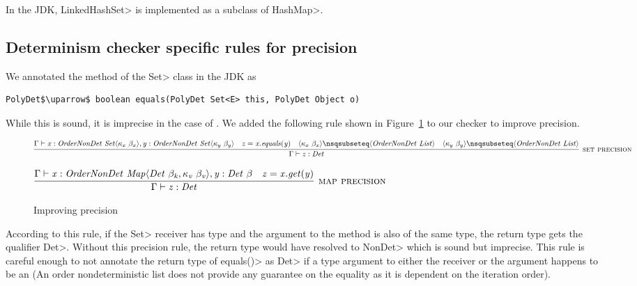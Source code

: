 In the JDK, \<LinkedHashSet> is implemented as a subclass of \<HashMap>.

\subsection{Determinism checker specific rules for precision}\label{precision}
We annotated the  method of the \<Set> class in the JDK as
\begin{verbatim}
PolyDet$\uparrow$ boolean equals(PolyDet Set<E> this, PolyDet Object o)
\end{verbatim}
While this is sound, it is imprecise in the case of . We added the following rule shown in Figure~\ref{fig-precision-rules} to our checker to improve precision.
\begin{figure}
    $\infer[\textsc{set precision}]{\Gamma \vdash \|z : Det|}{\Gamma \vdash \|x| : \|OrderNonDet| \ \|Set|\angles{ \kappa_{x} \ \beta_{x}}, \|y| : \|OrderNonDet| \ \|Set|\angles{ \kappa_{y} \ \beta_{y}} & \|z = x.equals(y)| & \angles{ \kappa_{x} \ \beta_{x}} \nsqsubseteq \angles{ \|OrderNonDet \ List| } & \angles{ \kappa_{y} \ \beta_{y}} \nsqsubseteq \angles{ \|OrderNonDet \ List| } }$
    
    \bigskip
    
    $\infer[\textsc{map precision}]{\Gamma \vdash \|z : Det|}{\Gamma \vdash \|x : OrderNonDet \ Map\angles{ Det \ \beta_k, \kappa_v\ \beta_v }, y : Det \ \beta| & \|z = x.get(y)|}$
    
    \caption{Improving precision}
    \label{fig-precision-rules}
\end{figure}
According to this rule, if the \<Set> receiver has type  and the argument to the  method is
also of the same type, the return type gets the qualifier \<Det>. Without this precision rule, the return type would have resolved to \<NonDet> which
is sound but imprecise. This rule is careful enough to not annotate the return type of \<equals()> as \<Det> if a type argument to either the
receiver or the argument happens to be an  (An order nondeterministic list does not provide any guarantee on the
equality as it is dependent on the iteration order). 

